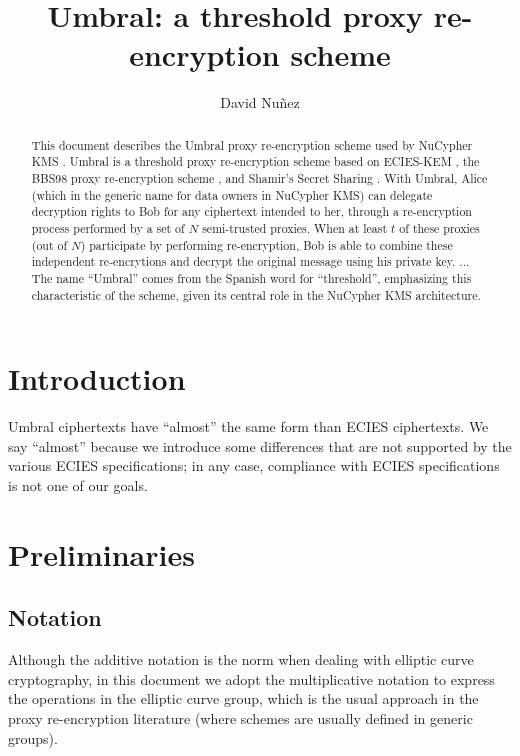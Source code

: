 \documentclass[12pt]{article}
\title{Umbral: a threshold proxy re-encryption scheme}
\author{David Nuñez}
\date{} %
\begin{document}
\maketitle

\begin{abstract}
This document describes the Umbral proxy re-encryption scheme used by NuCypher KMS \cite{egorov2017nucypherkms}. 
Umbral is a threshold proxy re-encryption scheme based on ECIES-KEM \cite{ansi-x9.63}, the BBS98 proxy re-encryption scheme  \cite{blaze1998divertible}, and Shamir's Secret Sharing \cite{shamir1979share}. 
With Umbral, Alice (which in the generic name for data owners in NuCypher KMS) can delegate decryption rights to Bob for any ciphertext intended to her, through a re-encryption process performed by a set of $N$ semi-trusted proxies. When at least $t$ of these proxies (out of $N$) participate by performing re-encryption, Bob is able to combine these independent re-encrytions and decrypt the original message using his private key. 
...
The name ``Umbral'' comes from the Spanish word for ``threshold'', emphasizing this characteristic of the scheme, given its central role in the NuCypher KMS architecture. 
\end{abstract}



\section{Introduction}



Umbral ciphertexts have ``almost'' the same form than ECIES ciphertexts. We say ``almost'' because we introduce some differences that are not supported by the various ECIES specifications; in any case, compliance with ECIES specifications is not one of our goals. 





\section{Preliminaries}

\subsection{Notation}

Although the additive notation is the norm when dealing with elliptic curve cryptography, in this document we adopt the multiplicative notation to express the operations in the elliptic curve group, which is the usual approach in the proxy re-encryption literature (where schemes are usually defined in generic groups).
\end{document}
